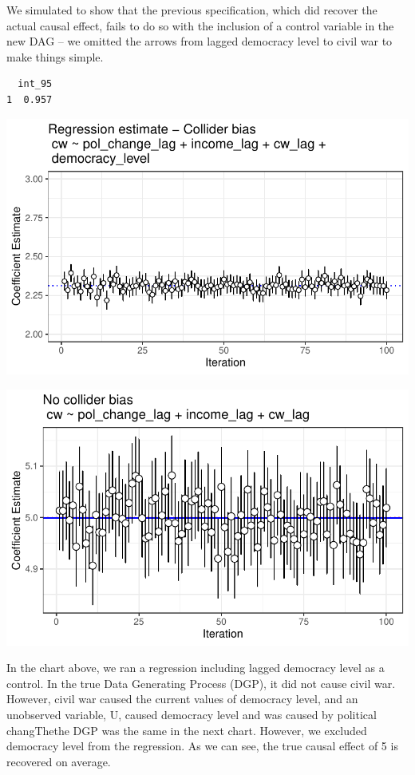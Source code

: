 \documentclass[
  super,
  preprint,
  3p]{elsarticle}
\begin{document}
We simulated to show that the previous specification, which did recover
the actual causal effect, fails to do so with the inclusion of a control
variable in the new DAG -- we omitted the arrows from lagged democracy
level to civil war to make things simple.

\begin{verbatim}
  int_95
1  0.957
\end{verbatim}

\includegraphics{Papers_beware_collider_files/figure-pdf/simulation 2-1.pdf}

\includegraphics{Papers_beware_collider_files/figure-pdf/simulation 2-2.pdf}

In the chart above, we ran a regression including lagged democracy level
as a control. In the true Data Generating Process (DGP), it did not
cause civil war. However, civil war caused the current values of
democracy level, and an unobserved variable, U, caused democracy level
and was caused by political changThethe DGP was the same in the next
chart. However, we excluded democracy level from the regression. As we
can see, the true causal effect of 5 is recovered on average.
\end{document}
